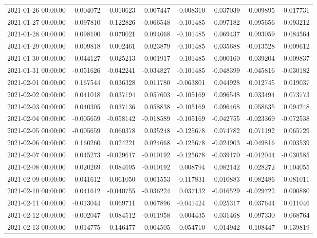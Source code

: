 \begin{tabular}{lrrrrrrr}
2021-01-26 00:00:00 & 0.004072 & -0.010623 & 0.007447 & -0.008310 & 0.037039 & -0.009895 & -0.017731 \\
2021-01-27 00:00:00 & -0.097810 & -0.122826 & -0.066548 & -0.101485 & -0.097182 & -0.095656 & -0.093212 \\
2021-01-28 00:00:00 & 0.098100 & 0.070021 & 0.094668 & -0.101485 & 0.069437 & 0.093059 & 0.084564 \\
2021-01-29 00:00:00 & 0.009818 & 0.002461 & 0.023879 & -0.101485 & 0.035688 & -0.013528 & 0.009612 \\
2021-01-30 00:00:00 & 0.044127 & 0.025213 & 0.001917 & -0.101485 & 0.000160 & 0.039204 & -0.009837 \\
2021-01-31 00:00:00 & -0.051626 & -0.042241 & -0.034827 & -0.101485 & -0.048399 & -0.045816 & -0.030182 \\
2021-02-01 00:00:00 & 0.167544 & 0.036328 & 0.011780 & -0.063801 & 0.044928 & 0.012745 & 0.019037 \\
2021-02-02 00:00:00 & 0.041018 & 0.037194 & 0.057603 & -0.105169 & 0.096548 & 0.033494 & 0.073773 \\
2021-02-03 00:00:00 & 0.040305 & 0.037136 & 0.058838 & -0.105169 & 0.096468 & 0.058635 & 0.094248 \\
2021-02-04 00:00:00 & -0.005659 & -0.058142 & -0.018589 & -0.105169 & -0.042755 & -0.023369 & -0.072538 \\
2021-02-05 00:00:00 & -0.005659 & 0.060378 & 0.035248 & -0.125678 & 0.074782 & 0.071192 & 0.065729 \\
2021-02-06 00:00:00 & 0.160260 & 0.024221 & 0.024668 & -0.125678 & -0.024903 & -0.049816 & 0.003539 \\
2021-02-07 00:00:00 & 0.045273 & -0.029617 & -0.010192 & -0.125678 & -0.039170 & -0.012044 & -0.030585 \\
2021-02-08 00:00:00 & 0.020269 & 0.084695 & -0.010192 & 0.008794 & 0.082142 & 0.028272 & 0.104055 \\
2021-02-09 00:00:00 & 0.041612 & 0.061050 & 0.001553 & -0.117831 & 0.010883 & 0.082486 & 0.081011 \\
2021-02-10 00:00:00 & 0.041612 & -0.040755 & -0.036224 & 0.037132 & -0.016529 & -0.029722 & 0.000880 \\
2021-02-11 00:00:00 & -0.013044 & 0.069711 & 0.067896 & -0.041424 & 0.025317 & 0.037644 & 0.011046 \\
2021-02-12 00:00:00 & -0.002047 & 0.084512 & -0.011958 & 0.004435 & 0.031468 & 0.097330 & 0.068764 \\
2021-02-13 00:00:00 & -0.014775 & 0.146477 & -0.004505 & -0.054710 & -0.014942 & 0.108447 & 0.139819 \\

\end{tabular}
